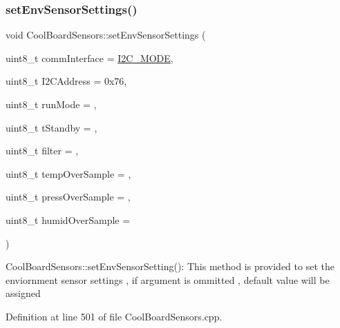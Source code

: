\subsubsection{\texorpdfstring{set\+Env\+Sensor\+Settings()}{setEnvSensorSettings()}}
{\footnotesize\ttfamily void Cool\+Board\+Sensors\+::set\+Env\+Sensor\+Settings (\begin{DoxyParamCaption}\item[{uint8\+\_\+t}]{comm\+Interface = {\ttfamily \hyperlink{_cool_spark_fun_b_m_e280_8h_a5cd01756030509b764d43a2b8c94fce8}{I2\+C\+\_\+\+M\+O\+DE}},  }\item[{uint8\+\_\+t}]{I2\+C\+Address = {\ttfamily 0x76},  }\item[{uint8\+\_\+t}]{run\+Mode = {},  }\item[{uint8\+\_\+t}]{t\+Standby = {},  }\item[{uint8\+\_\+t}]{filter = {},  }\item[{uint8\+\_\+t}]{temp\+Over\+Sample = {},  }\item[{uint8\+\_\+t}]{press\+Over\+Sample = {},  }\item[{uint8\+\_\+t}]{humid\+Over\+Sample = {} }\end{DoxyParamCaption})}

Cool\+Board\+Sensors\+::set\+Env\+Sensor\+Setting()\+: This method is provided to set the enviornment sensor settings , if argument is ommitted , default value will be assigned 

Definition at line 501 of file Cool\+Board\+Sensors.\+cpp.


